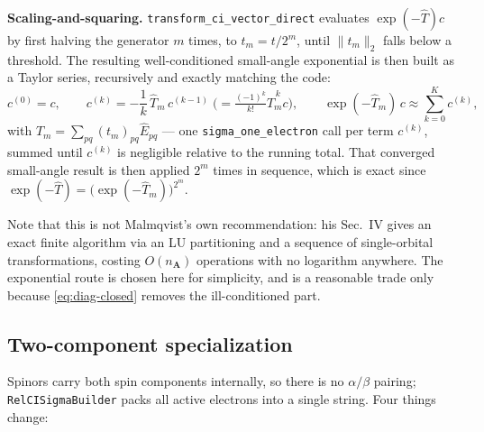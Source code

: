 \documentclass[aip,jcp,preprint]{revtex4-1}
\begin{document}
\textbf{Scaling-and-squaring.} \texttt{transform\_ci\_vector\_direct}
evaluates $\exp(-\hat{T})c$ by first halving the generator $m$ times, to
$t_m = t/2^m$, until $\lVert t_m\rVert_2$ falls below a threshold. The
resulting well-conditioned small-angle exponential is then built as a Taylor
series, recursively and exactly matching the code:
\begin{equation}
 c^{(0)} = c, \qquad
 c^{(k)} = -\frac{1}{k}\,\hat{T}_m\,c^{(k-1)}
 \;\Big(=\tfrac{(-1)^k}{k!}\hat{T}_m^{\,k}c\Big),
 \qquad
 \exp(-\hat{T}_m)\,c \approx \sum_{k=0}^{K} c^{(k)},
\end{equation}
with $\hat{T}_m=\sum_{pq}(t_m)_{pq}\hat{E}_{pq}$ --- one
\texttt{sigma\_one\_electron} call per term $c^{(k)}$, summed until $c^{(k)}$
is negligible relative to the running total. That converged small-angle
result is then applied $2^m$ times in sequence, which is exact since
$\exp(-\hat{T})=\big(\exp(-\hat{T}_m)\big)^{2^m}$.

Note that this is not Malmqvist's
own recommendation: his Sec.~IV gives an exact finite algorithm via an LU
partitioning and a sequence of single-orbital transformations, costing
$O(n_{\mathbf{A}})$ operations with no logarithm anywhere. The exponential route is
chosen here for simplicity, and is a reasonable trade only because
\cref{eq:diag-closed} removes the ill-conditioned part.

\subsection{Two-component specialization}
\label{sec:twocomp}

Spinors carry both spin components internally, so there is no $\alpha/\beta$
pairing; \texttt{RelCISigmaBuilder} packs all active electrons into a single
string. Four things change:
\end{document}

